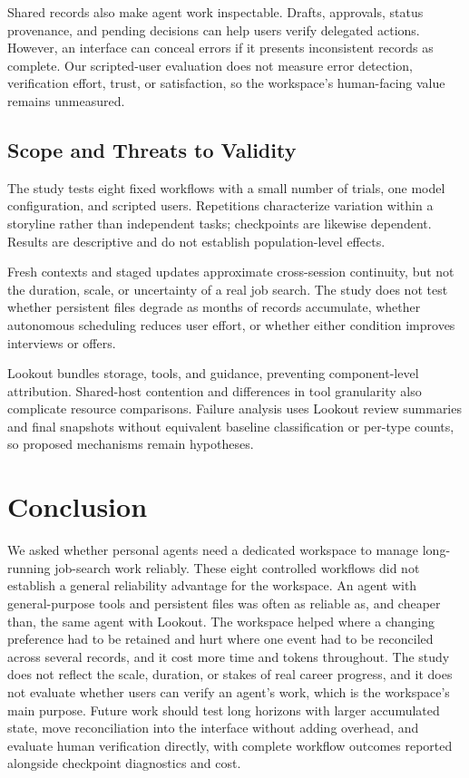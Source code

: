 \documentclass[twocolumn]{article}
\begin{document}
Shared records also make agent work inspectable. Drafts, approvals, status provenance, and pending decisions can help users verify delegated actions. However, an interface can conceal errors if it presents inconsistent records as complete. Our scripted-user evaluation does not measure error detection, verification effort, trust, or satisfaction, so the workspace's human-facing value remains unmeasured.

\subsection{Scope and Threats to Validity}

The study tests eight fixed workflows with a small number of trials, one model configuration, and scripted users. Repetitions characterize variation within a storyline rather than independent tasks; checkpoints are likewise dependent. Results are descriptive and do not establish population-level effects.

Fresh contexts and staged updates approximate cross-session continuity, but not the duration, scale, or uncertainty of a real job search. The study does not test whether persistent files degrade as months of records accumulate, whether autonomous scheduling reduces user effort, or whether either condition improves interviews or offers.

Lookout bundles storage, tools, and guidance, preventing component-level attribution. Shared-host contention and differences in tool granularity also complicate resource comparisons. Failure analysis uses Lookout review summaries and final snapshots without equivalent baseline classification or per-type counts, so proposed mechanisms remain hypotheses.

\section{Conclusion}
We asked whether personal agents need a dedicated workspace to manage long-running job-search work reliably. These eight controlled workflows did not establish a general reliability advantage for the workspace. An agent with general-purpose tools and persistent files was often as reliable as, and cheaper than, the same agent with Lookout. The workspace helped where a changing preference had to be retained and hurt where one event had to be reconciled across several records, and it cost more time and tokens throughout. The study does not reflect the scale, duration, or stakes of real career progress, and it does not evaluate whether users can verify an agent's work, which is the workspace's main purpose. Future work should test long horizons with larger accumulated state, move reconciliation into the interface without adding overhead, and evaluate human verification directly, with complete workflow outcomes reported alongside checkpoint diagnostics and cost.
\end{document}
